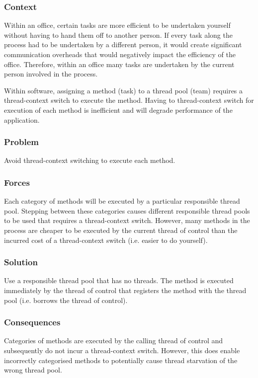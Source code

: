 \documentclass[prodmode]{style/acmlarge}
\begin{document}
\subsubsection*{Context} Within an office, certain tasks are more efficient to
be undertaken yourself without having to hand them off to another person.  If
every task along the process had to be undertaken by a different person, it
would create significant communication overheads that would negatively impact
the efficiency of the office.  Therefore, within an office many tasks are
undertaken by the current person involved in the process.

Within software, assigning a method (task) to a thread pool (team) requires a
thread-context switch to execute the method.  Having to thread-context switch
for execution of each method is inefficient and will degrade performance of the
application.

\subsubsection*{\textbf{Problem}} Avoid thread-context switching to execute each method.

\subsubsection*{Forces} Each category of methods will be executed by a
particular responsible thread pool.  Stepping between these categories causes
different responsible thread pools to be used that requires a thread-context
switch.  However, many methods in the process are cheaper to be executed by the
current thread of control than the incurred cost of a thread-context switch
(i.e. easier to do yourself).

\subsubsection*{\textbf{Solution}} Use a responsible thread pool that has no threads.
The method is executed immediately by the thread of control that registers the
method with the thread pool (i.e. borrows the thread of control).

\subsubsection*{Consequences} Categories of methods are executed by the calling
thread of control and subsequently do not incur a thread-context switch.
However, this does enable incorrectly categorised methods to potentially cause
thread starvation of the wrong thread pool.
\end{document}
